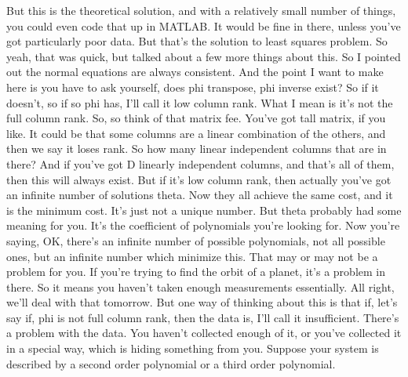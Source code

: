 \documentclass[11pt,a4paper]{article}
\begin{document}
But this is the theoretical solution, and with a relatively small number of things, you could even code that up in MATLAB. It would be fine in there, unless you've got particularly poor data. But that's the solution to least squares problem. So yeah, that was quick, but talked about a few more things about this. So I pointed out the normal equations are always consistent. And the point I want to make here is you have to ask yourself, does phi transpose, phi inverse exist? So if it doesn't, so if so phi has, I'll call it low column rank. What I mean is it's not the full column rank. So, so think of that matrix fee. You've got tall matrix, if you like. It could be that some columns are a linear combination of the others, and then we say it loses rank. So how many linear independent columns that are in there? And if you've got D linearly independent columns, and that's all of them, then this will always exist. But if it's low column rank, then actually you've got an infinite number of solutions theta. Now they all achieve the same cost, and it is the minimum cost. It's just not a unique number. But theta probably had some meaning for you. It's the coefficient of polynomials you're looking for. Now you're saying, OK, there's an infinite number of possible polynomials, not all possible ones, but an infinite number which minimize this. That may or may not be a problem for you. If you're trying to find the orbit of a planet, it's a problem in there. So it means you haven't taken enough measurements essentially. All right, we'll deal with that tomorrow. But one way of thinking about this is that if, let's say if, phi is not full column rank, then the data is, I'll call it insufficient. There's a problem with the data. You haven't collected enough of it, or you've collected it in a special way, which is hiding something from you. Suppose your system is described by a second order polynomial or a third order polynomial.
\end{document}
